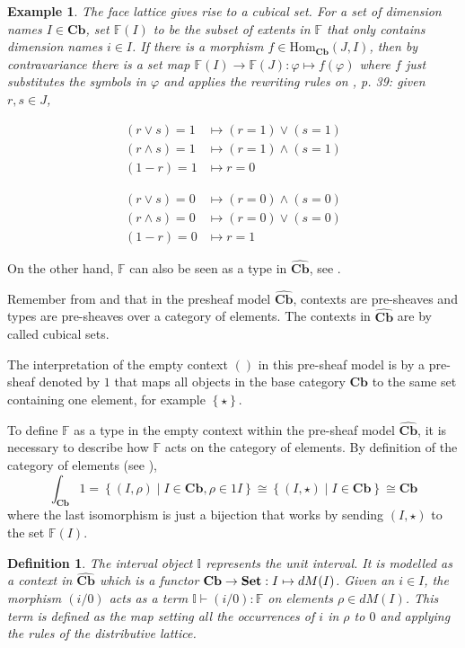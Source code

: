 \documentclass[12pt,a4paper,twoside,xetex]{book} %
\newcommand{\keyword}[1]{\emph{#1}\index{#1}}
\newtheorem{definition}[theorem]{Definition}
\newtheorem{example}[theorem]{Example}
\newcommand{\psh}[1]{\widehat{#1}}
\newcommand{\singleton}[0]{\left\{ \star \right\}}
\newcommand{\homo}[3]{\text{Hom}_{#1}\left(#2,#3\right)}
\newcommand{\cube}[0]{\textbf{Cb}}
\begin{document}
\begin{example}\label{facecubical}
The face lattice gives rise to a cubical set. For a set of dimension names $I\in 
\cube$, set $\mathbb{F}(I)$ to be the subset of extents in 
$\mathbb{F}$ that only contains dimension names $i \in I$. If there is a morphism $f \in 
\homo{\cube}{J}{I}$, then by contravariance there is a set map $\mathbb{F}(I) \rightarrow \mathbb{F}(J): \varphi 
\mapsto f(\varphi)$ where $f$ just substitutes the symbols in $\varphi$ and 
applies the rewriting rules on \cite{Orton2019}, p. 39: given $r,s \in J$,

$$\begin{aligned}(r \vee s)=1 & \mapsto(r=1) \vee(s=1) \\(r \wedge s)=1 & \mapsto(r=1) \wedge(s=1) \\(1-r)=1 & \mapsto r=0 \end{aligned}$$
 
$$\begin{aligned}(r \vee s)=0 & \mapsto(r=0) \wedge(s=0) \\(r \wedge s)=0 & \mapsto (r=0) \vee(s=0) \\(1-r)=0 & \mapsto r=1 \end{aligned}$$
\end{example}


On the other hand, $\mathbb{F}$ can also be seen as a type in $\psh{\cube}$, see . 

Remember from  and  that in the presheaf model $\psh{\cube}$, contexts are 
pre-sheaves and types are pre-sheaves over a category of elements. The contexts 
in $\psh{\cube}$ are by  called cubical sets.

The interpretation of the empty context $()$ in this pre-sheaf model is by 
 a pre-sheaf denoted by $1$ that maps all objects in the base 
category $\cube$ to the same set containing one element, for example $\singleton$. 

To define $\mathbb{F}$ as a type in the empty context within the pre-sheaf 
model $\psh{\cube}$, it is necessary to describe how $\mathbb{F}$ acts on the category of elements. By definition of the category of elements (see ), 
$$\int_{\cube} 1 = \left\{ (I, \rho ) \mid I \in \cube, \rho \in 1I 
\right\} \cong \left\{ (I, \star ) \mid I \in \cube \right\}  \cong 
\cube$$ where the last isomorphism is just a bijection that works by 
sending $(I, \star )$ to the set $\mathbb{F}(I)$.


\begin{definition}\label{interval}
The \keyword{interval object} $\mathbb{I}$ represents the unit interval. It is 
modelled as a context in $\psh{\cube}$ which is a functor  
$\cube \rightarrow \set : I \mapsto dM(I)$. Given an $i \in I$, the morphism $(i/0)$ acts as a term $\mathbb{I} \vdash (i/0) : \mathbb{F}$ on elements $\rho \in dM (I)$. This term is defined as the map setting all the occurrences of $i$ in $\rho$ to $0$ 
and applying the rules of the distributive lattice.
\end{definition}
\end{document}
